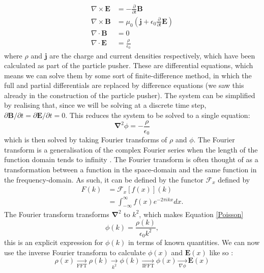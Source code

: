 \begin{equation}\label{Maxwell}
\begin{aligned} 
    \nabla \times \mathbf{E} &= - \frac{\partial}{\partial t}\mathbf{B} \\
    \nabla \times \mathbf{B} &= \mu_0 \left (\mathbf{j} + \epsilon_0\frac{\partial}{\partial t}\mathbf{E}\right)\\
    \nabla \cdot \mathbf{B} &= 0\\
    \nabla \cdot \mathbf{E} &= \frac{\rho}{\epsilon_0}
\end{aligned}
\end{equation} where $\rho$ and $\mathbf{j}$ are the charge and current densities respectively, which have been calculated as part of the particle pusher. These are differential equations, which means we can solve them by some sort of finite-difference method, in which the full and partial differentials are replaced by difference equations (we saw this already in the construction of the particle pusher). The system can be simplified by realising that, since we will be solving at a discrete time step, $\partial \mathbf{B}/\partial t = \partial \mathbf{E}/\partial t =0$. This reduces the system to be solved to a single equation: 
\begin{equation}\label{Poisson}
    \bm{\nabla}^2 \phi = - \frac{\rho}{\epsilon_0}
\end{equation} which is then solved by taking Fourier transforms of $\rho$ and $\phi$. The Fourier transform is a generalisation of the complex Fourier series when the length of the function domain tends to infinity \citep{wolfram}. The Fourier transform is often thought of as a transformation between a function in the space-domain and the same function in the frequency-domain. As such, it can be defined by the functor $\mathcal{F}_x$ defined by
\begin{equation}\label{FT}
\begin{aligned}
    F(k)&=\mathcal{F}_x\left[f(x)\right](k)\\
    &= \int_{-\infty}^{\infty} f(x)e^{-2\pi i kx}dx.
\end{aligned}
\end{equation} The Fourier transform transforms $\bm{\nabla}^2$ to $k^2$, which makes Equation \ref{Poisson}
\begin{equation}
    \phi(k)=\frac{\rho (k)}{\epsilon_0 k^2},
\end{equation} this is an explicit expression for $\phi(k)$ in terms of known quantities. We can now use the inverse Fourier transform to calculate $\phi(x)$ and $\mathbf{E}(x)$ like so \citep{Birdsall}:
\begin{equation*}
    \rho(x)\xrightarrow[\text{FFT}]{}\rho(k)\xrightarrow[{k^2}]{}\phi(k)\xrightarrow[\text{IFFT}]{}\phi(x)\xrightarrow[{\nabla\phi}]{}\mathbf{E}(x)
\end{equation*}

